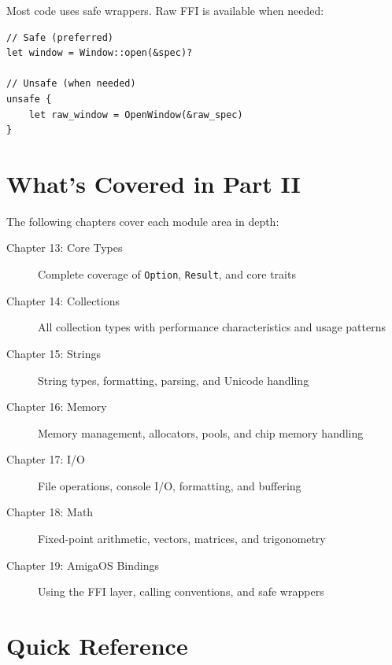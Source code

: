 Most code uses safe wrappers. Raw FFI is available when needed:

\begin{lstlisting}
// Safe (preferred)
let window = Window::open(&spec)?

// Unsafe (when needed)
unsafe {
    let raw_window = OpenWindow(&raw_spec)
}
\end{lstlisting}

\section{What's Covered in Part II}
\label{sec:stdlib-roadmap}

The following chapters cover each module area in depth:

\begin{description}
    \item[Chapter 13: Core Types] Complete coverage of \texttt{Option}, \texttt{Result}, and core traits

    \item[Chapter 14: Collections] All collection types with performance characteristics and usage patterns

    \item[Chapter 15: Strings] String types, formatting, parsing, and Unicode handling

    \item[Chapter 16: Memory] Memory management, allocators, pools, and chip memory handling

    \item[Chapter 17: I/O] File operations, console I/O, formatting, and buffering

    \item[Chapter 18: Math] Fixed-point arithmetic, vectors, matrices, and trigonometry

    \item[Chapter 19: AmigaOS Bindings] Using the FFI layer, calling conventions, and safe wrappers
\end{description}

\section{Quick Reference}
\label{sec:stdlib-quick-ref}

